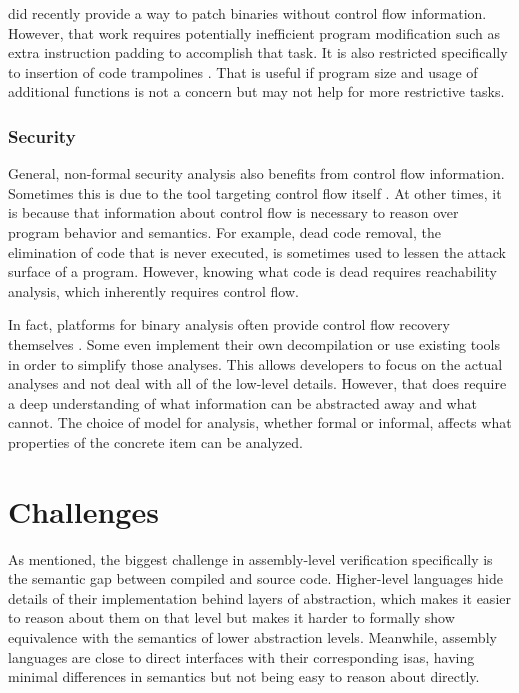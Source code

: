 \Textcite{duck2020binary} did recently provide a way to patch binaries without control flow information.
However, that work requires potentially inefficient program modification such as extra instruction padding to accomplish that task.
It is also restricted specifically to insertion of code trampolines .
That is useful if program size and usage of additional functions is not a concern but may not help for more restrictive tasks.

\subsubsection{Security}
General, non-formal security analysis also benefits from control flow information.
Sometimes this is due to the tool targeting control flow itself \autocite{kruegel2005automating,davi2009dynamic}.
At other times, it is because that information about control flow is necessary to reason over program behavior and semantics.
For example, dead code removal, the elimination of code that is never executed, is sometimes used to lessen the attack surface of a program.
However, knowing what code is dead requires reachability analysis, which inherently requires control flow.

In fact, platforms for binary analysis often provide control flow recovery themselves \autocite{song2008bitblaze,wang2017angr}.
Some even implement their own decompilation or use existing tools in order to simplify those analyses.
This allows developers to focus on the actual analyses and not deal with all of the low-level details.
However, that does require a deep understanding of what information can be abstracted away and what cannot.
The choice of model for analysis, whether formal or informal, affects what properties of the concrete item can be analyzed.

\section{Challenges}\label{challenges}
As mentioned, the biggest challenge in assembly-level verification specifically is the semantic gap between compiled and source code.
Higher-level languages hide details of their implementation behind layers of abstraction, which makes it easier to reason about them on that level but makes it harder to formally show equivalence with the semantics of lower abstraction levels.
Meanwhile, assembly languages are close to direct interfaces with their corresponding \acp{isa}, having minimal differences in semantics but not being easy to reason about directly.


